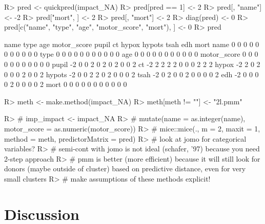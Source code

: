 \documentclass[
]{jss}
\begin{document}
\begin{CodeChunk}
\begin{CodeInput}
R> pred <- quickpred(impact_NA)
R> pred[pred == 1] <- 2
R> pred[, "name"] <- -2
R> pred["mort", ] <- 2
R> pred[, "mort"] <- 2
R> diag(pred) <- 0
R> pred[c("name", "type", "age", "motor_score", "mort"), ] <- 0
R> pred
\end{CodeInput}
\begin{CodeOutput}
            name type age motor_score pupil ct hypox hypots tsah edh mort
name           0    0   0           0     0  0     0      0    0   0    0
type           0    0   0           0     0  0     0      0    0   0    0
age            0    0   0           0     0  0     0      0    0   0    0
motor_score    0    0   0           0     0  0     0      0    0   0    0
pupil         -2    0   0           2     0  2     0      2    0   0    2
ct            -2    2   2           2     2  0     0      0    2   2    2
hypox         -2    2   0           2     0  0     0      2    0   0    2
hypots        -2    0   0           2     2  0     2      0    0   0    2
tsah          -2    0   2           0     0  2     0      0    0   0    2
edh           -2    0   0           0     0  2     0      0    0   0    2
mort           0    0   0           0     0  0     0      0    0   0    0
\end{CodeOutput}
\begin{CodeInput}
R> meth <- make.method(impact_NA)
R> meth[meth != ""] <- "2l.pmm"
\end{CodeInput}
\end{CodeChunk}

\begin{CodeChunk}
\begin{CodeInput}
R> # imp_impact <- impact_NA %
R> #   mutate(name = as.integer(name), motor_score = as.numeric(motor_score)) %
R> #   mice::mice(., m = 2, maxit = 1, method = meth, predictorMatrix = pred)
R> # look at jomo for categorical variables?
R> # semi-cont with jomo is not ideal (schafer, '97) because you need 2-step approach
R> # pmm is better (more efficient) because it will still look for donors (maybe outside of cluster) based on predictive distance, even for very small clusters
R> # make assumptions of these methods explicit!
\end{CodeInput}
\end{CodeChunk}

\hypertarget{discussion}{%
\section{Discussion}\label{discussion}}
\end{document}
